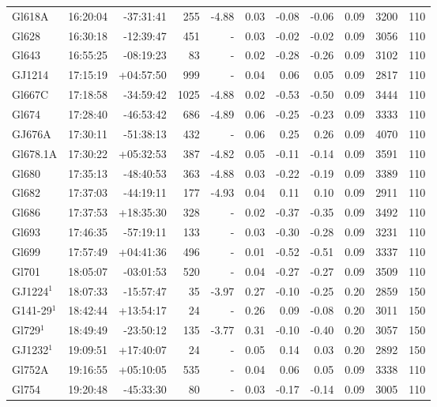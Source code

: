 \documentclass[referee]{aa}
\begin{document}
{\begin{longtable}{l r r r r r r r r r r}
Gl618A & 16:20:04 & -37:31:41 & 255 & -4.88 & 0.03 & -0.08 & -0.06 & 0.09 & 3200 &  110 \\
Gl628 & 16:30:18 & -12:39:47 & 451 &    - & 0.03 & -0.02 & -0.02 & 0.09 & 3056 &  110 \\
Gl643 & 16:55:25 & -08:19:23 & 83 &    - & 0.02 & -0.28 & -0.26 & 0.09 & 3102 &  110 \\
GJ1214 & 17:15:19 & +04:57:50 & 999 &    - & 0.04 & 0.06 & 0.05 & 0.09 & 2817 &  110 \\
Gl667C & 17:18:58 & -34:59:42 & 1025 & -4.88 & 0.02 & -0.53 & -0.50 & 0.09 & 3444 &  110 \\
Gl674 & 17:28:40 & -46:53:42 & 686 & -4.89 & 0.06 & -0.25 & -0.23 & 0.09 & 3333 &  110 \\
GJ676A & 17:30:11 & -51:38:13 & 432 &    - & 0.06 & 0.25 & 0.26 & 0.09 & 4070 &  110 \\
Gl678.1A & 17:30:22 & +05:32:53 & 387 & -4.82 & 0.05 & -0.11 & -0.14 & 0.09 & 3591 &  110 \\
Gl680 & 17:35:13 & -48:40:53 & 363 & -4.88 & 0.03 & -0.22 & -0.19 & 0.09 & 3389 &  110 \\
Gl682 & 17:37:03 & -44:19:11 & 177 & -4.93 & 0.04 & 0.11 & 0.10 & 0.09 & 2911 &  110 \\
Gl686 & 17:37:53 & +18:35:30 & 328 &    - & 0.02 & -0.37 & -0.35 & 0.09 & 3492 &  110 \\
Gl693 & 17:46:35 & -57:19:11 & 133 &    - & 0.03 & -0.30 & -0.28 & 0.09 & 3231 &  110 \\
Gl699 & 17:57:49 & +04:41:36 & 496 &    - & 0.01 & -0.52 & -0.51 & 0.09 & 3337 &  110 \\
Gl701 & 18:05:07 & -03:01:53 & 520 &    - & 0.04 & -0.27 & -0.27 & 0.09 & 3509 &  110 \\
GJ1224$^1$ & 18:07:33 & -15:57:47 & 35 & -3.97 & 0.27 & -0.10 & -0.25 & 0.20 & 2859 &  150 \\
G141-29$^1$ & 18:42:44 & +13:54:17 & 24 &    - & 0.26 & 0.09 & -0.08 & 0.20 & 3011 &  150 \\
Gl729$^1$ & 18:49:49 & -23:50:12 & 135 & -3.77 & 0.31 & -0.10 & -0.40 & 0.20 & 3057 &  150 \\
GJ1232$^1$ & 19:09:51 & +17:40:07 & 24 &    - & 0.05 & 0.14 & 0.03 & 0.20 & 2892 &  150 \\
Gl752A & 19:16:55 & +05:10:05 & 535 &    - & 0.04 & 0.06 & 0.05 & 0.09 & 3338 &  110 \\
Gl754 & 19:20:48 & -45:33:30 & 80 &    - & 0.03 & -0.17 & -0.14 & 0.09 & 3005 &  110 \\

\end{longtable}}
\end{document}
